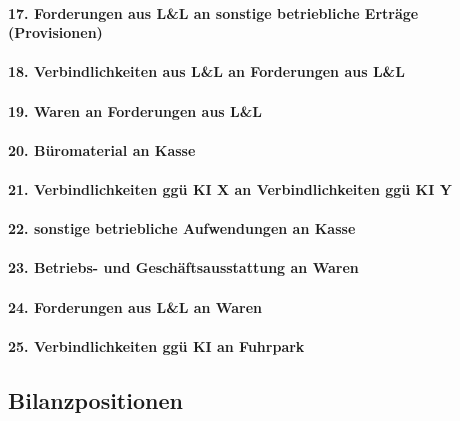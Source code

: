\documentclass[paper=a4, fontsize=11pt]{scrartcl}
\numberwithin{equation}{section}
\numberwithin{figure}{section}
\numberwithin{table}{section}
\begin{document}
\paragraph{17. Forderungen aus L&L an sonstige betriebliche Erträge (Provisionen)}

\paragraph{18. Verbindlichkeiten aus L&L an Forderungen aus L&L}

\paragraph{19. Waren an Forderungen aus L&L}

\paragraph{20. Büromaterial an Kasse}

\paragraph{21. Verbindlichkeiten ggü KI X an Verbindlichkeiten ggü KI Y}

\paragraph{22. sonstige betriebliche Aufwendungen an Kasse}

\paragraph{23. Betriebs- und Geschäftsausstattung an Waren}

\paragraph{24. Forderungen aus L&L an Waren}

\paragraph{25. Verbindlichkeiten ggü KI an Fuhrpark}


\subsection{Bilanzpositionen}
\end{document}
